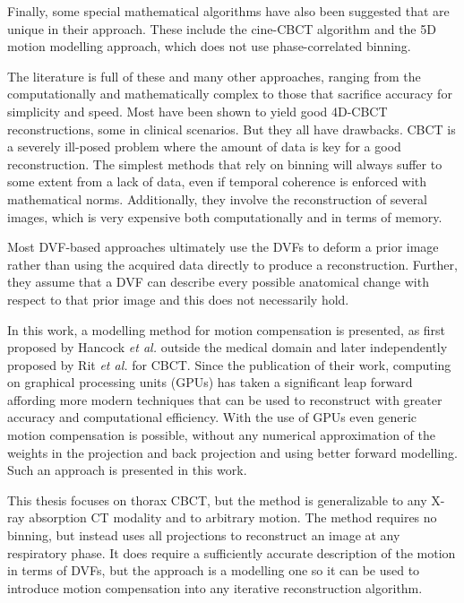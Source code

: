 Finally, some special mathematical algorithms have also been suggested that are unique in their approach.  These include the cine-CBCT algorithm\cite{6803058} and the 5D motion modelling approach\cite{0266-5611-31-11-115007}, which does not use phase-correlated binning.

The literature is full of these and many other approaches, ranging from the computationally and mathematically complex to those that sacrifice accuracy for simplicity and speed.  Most have been shown to yield good 4D-CBCT reconstructions, some in clinical scenarios.  But they all have drawbacks.  CBCT is a severely ill-posed problem where the amount of data is key for a good reconstruction.  The simplest methods that rely on binning will always suffer to some extent from a lack of data, even if temporal coherence is enforced with mathematical norms.  Additionally, they involve the reconstruction of several images, which is very expensive both computationally and in terms of memory.

Most DVF-based approaches ultimately use the DVFs to deform a prior image rather than using the acquired data directly to produce a reconstruction.  Further, they assume that a DVF can describe every possible anatomical change with respect to that prior image and this does not necessarily hold.

In this work, a modelling method for motion compensation is presented, as first proposed by Hancock \textit{et al.}\cite{pst1} outside the medical domain and later independently proposed by Rit \textit{et al.}\cite{Rit1}\cite{Rit2} for CBCT. Since the publication of their work, computing on graphical processing units (GPUs) has taken a significant leap forward affording more modern techniques that can be used to reconstruct with greater accuracy and computational efficiency. With the use of GPUs even generic motion compensation is possible, without any numerical approximation of the weights in the projection and back projection and using better forward modelling\cite{fwdproj}. Such an approach is presented in this work.

This thesis focuses on thorax CBCT, but the method is generalizable to any X-ray absorption CT modality and to arbitrary motion.  The method requires no binning, but instead uses all projections to reconstruct an image at any respiratory phase.  It does require a sufficiently accurate description of the motion in terms of DVFs, but the approach is a modelling one so it can be used to introduce motion compensation into any iterative reconstruction algorithm. 

